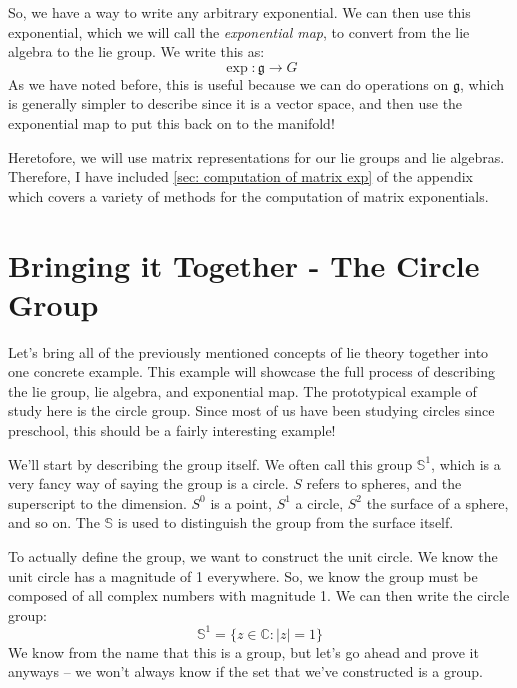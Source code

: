 So, we have a way to write any arbitrary exponential. We can then use this exponential, which we will call the \textit{exponential map}, to convert from the \gls{lie algebra} to the \gls{lie group}. We write this as:
$$\exp:\mathfrak{g}\rightarrow G$$
As we have noted before, this is useful because we can do operations on $\mathfrak{g}$, which is generally simpler to describe since it is a vector space, and then use the exponential map to put this back on to the manifold!

Heretofore, we will use matrix representations for our \glspl{lie group} and \glspl{lie algebra}. Therefore, I have included \autoref{sec: computation of matrix exp} of the appendix which covers a variety of methods for the computation of matrix exponentials.

\section{Bringing it Together - The Circle Group}
Let's bring all of the previously mentioned concepts of \gls{lie theory} together into one concrete example. This example will showcase the full process of describing the \gls{lie group}, \gls{lie algebra}, and \gls{exponential map}. The prototypical example of study here is the circle group. Since most of us have been studying circles since preschool, this should be a fairly interesting example!

We'll start by describing the group itself. We often call this group $\mathbb{S}^1$, which is a very fancy way of saying the group is a circle. $S$ refers to spheres, and the superscript to the dimension. $S^0$ is a point, $S^1$ a circle, $S^2$ the surface of a sphere, and so on. The $\mathbb{S}$ is used to distinguish the group from the surface itself.

To actually define the group, we want to construct the unit circle. We know the unit circle has a magnitude of 1 everywhere. So, we know the group must be composed of all complex numbers with magnitude 1. We can then write the circle group:
$$\mathbb{S}^1=\{z\in\mathbb{C}:|z|=1\}$$
 We know from the name that this is a group, but let's go ahead and prove it anyways -- we won't always know if the set that we've constructed is a group.
